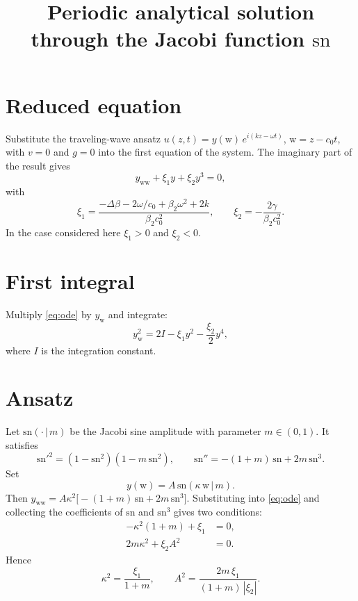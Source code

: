 \documentclass{article}
\title{Periodic analytical solution through the Jacobi function $\mathrm{sn}$}
\author{}
\date{}
\begin{document}
\maketitle

\section{Reduced equation}
Substitute the traveling-wave ansatz $u(z,t)=y(\mathrm{w})\,e^{i(kz-\omega t)}$, $\mathrm{w}=z-c_0 t$, with $v=0$ and $g=0$ into the first equation of the system. The imaginary part of the result gives
\begin{equation}\label{eq:ode}
    y_{\mathrm{ww}} + \xi_1 y + \xi_2 y^3 = 0,
\end{equation}
with
\begin{equation}\label{eq:xi}
    \xi_1 = \frac{-\Delta\beta - 2\omega/c_0 + \beta_2\omega^2 + 2k}{\beta_2 c_0^2},
    \qquad
    \xi_2 = -\frac{2\gamma}{\beta_2 c_0^2}.
\end{equation}
In the case considered here $\xi_1>0$ and $\xi_2<0$.

\section{First integral}
Multiply \eqref{eq:ode} by $y_{\mathrm{w}}$ and integrate:
\begin{equation}\label{eq:first}
    y_{\mathrm{w}}^2 = 2I - \xi_1 y^2 - \frac{\xi_2}{2}y^4,
\end{equation}
where $I$ is the integration constant.

\section{Ansatz}
Let $\mathrm{sn}(\cdot\,|\,m)$ be the Jacobi sine amplitude with parameter $m\in(0,1)$. It satisfies
\begin{equation}\label{eq:sn_props}
    \mathrm{sn}'^2 = (1-\mathrm{sn}^2)(1-m\,\mathrm{sn}^2),
    \qquad
    \mathrm{sn}'' = -(1+m)\,\mathrm{sn} + 2m\,\mathrm{sn}^3 .
\end{equation}
Set
\begin{equation}\label{eq:ansatz}
    y(\mathrm{w}) = A\,\mathrm{sn}(\kappa\,\mathrm{w}\,|\,m).
\end{equation}
Then $y_{\mathrm{ww}} = A\kappa^2\bigl[-(1+m)\,\mathrm{sn} + 2m\,\mathrm{sn}^3\bigr]$. Substituting into \eqref{eq:ode} and collecting the coefficients of $\mathrm{sn}$ and $\mathrm{sn}^3$ gives two conditions:
\begin{align}
    -\kappa^2(1+m) + \xi_1 &= 0, \label{eq:c1}\\
    2m\kappa^2 + \xi_2 A^2 &= 0. \label{eq:c2}
\end{align}
Hence
\begin{equation}\label{eq:params}
    \kappa^2 = \frac{\xi_1}{1+m},
    \qquad
    A^2 = \frac{2m\,\xi_1}{(1+m)\,|\xi_2|}.
\end{equation}
\end{document}
